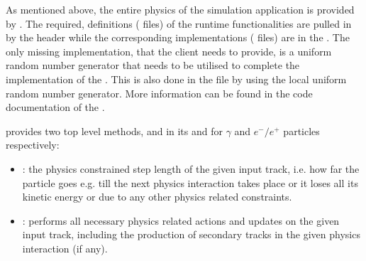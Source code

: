 \documentclass[letterpaper,10pt,english]{sphinxmanual}
\begin{document}
\sphinxAtStartPar
As mentioned above, the entire physics of the  simulation application is provided by  . The required,
definitions ( files) of the  run\sphinxhyphen{}time functionalities are pulled in by the  header while the corresponding
implementations ( files) are in the . The only missing implementation, that the client needs to provide, is a uniform
random number generator that needs to be utilised to complete the implementation of the . This is also done in the
 file by using the local {\hyperref[\detokenize{Simulation/SimulationCodeDoc:_CPPv47URandom}]{}} uniform random number generator. More information can be found in the code
documentation of the {\hyperref[\detokenize{Simulation/SimulationCodeDoc:_CPPv47Physics}]{}}.

\sphinxAtStartPar
{} provides two top level methods,  and  in its  and  for \(\gamma\) and \(e^-/e^+\) particles respectively:
\begin{itemize}
\item {} 
\sphinxAtStartPar
{}: the physics constrained step length of the given input track, i.e. how far the particle goes e.g. till the next physics
interaction takes place or it loses all its kinetic energy or due to any other physics related constraints.

\item {} 
\sphinxAtStartPar
{}: performs all necessary physics related actions and updates on the given input track, including the production of secondary
tracks in the given physics interaction (if any).

\end{itemize}
\end{document}
